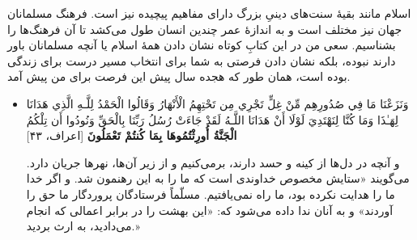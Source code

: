 اسلام مانند بقیهٔ سنت‌های دینیِ بزرگ دارای مفاهیم پیچیده نیز است. فرهنگ مسلمانان جهان نیز مختلف است و به اندازهٔ عمر چندین انسان طول می‌کشد تا آن فرهنگ‌ها را بشناسیم. سعی من در این کتابِ کوتاه نشان دادن همهٔ اسلام یا آنچه مسلمانان باور دارند نبوده، بلکه نشان دادن فرصتی به شما برای انتخاب مسیر درست برای زندگی بوده است، همان طور که هجده سال پیش این فرصت برای من پیش آمد.

\begin{itemize}
	\item[]
	{
		وَنَزَعْنَا مَا فِي صُدُورِهِم مِّنْ غِلٍّ تَجْرِي مِن تَحْتِهِمُ الْأَنْهَارُ  وَقَالُوا الْحَمْدُ لِلَّـهِ الَّذِي هَدَانَا لِهَـٰذَا وَمَا كُنَّا لِنَهْتَدِيَ لَوْلَا أَنْ هَدَانَا اللَّـهُ  لَقَدْ جَاءَتْ رُسُلُ رَبِّنَا بِالْحَقِّ  وَنُودُوا أَن تِلْكُمُ {\bfseries الْجَنَّةُ أُورِثْتُمُوهَا بِمَا كُنتُمْ تَعْمَلُونَ} [اعراف، ۴۳]} 
	
	{
		و آنچه در دل‌ها از کینه و حسد دارند، برمی‌کنیم و از زیر آن‌ها، نهرها جریان دارد. می‌گویند «ستایش مخصوص خداوندی است که ما را به این رهنمون شد. و اگر خدا ما را هدایت نکرده بود، ما راه نمی‌یافتیم. مسلّماً فرستادگان پروردگار ما حق را آوردند» و به آنان ندا داده می‌شود که: «این بهشت را در برابر اعمالی که انجام می‌دادید، به ارث بردید.» }
\end{itemize}







